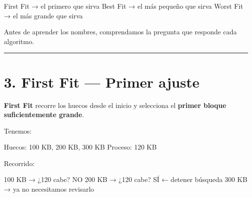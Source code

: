 \documentclass[
  spanish,
  letterpaper,
]{scrbook}
\newenvironment{Shaded}{\begin{snugshade}}{\end{snugshade}}
\newcommand{\NormalTok}[1]{\textcolor[rgb]{0.00,0.23,0.31}{#1}}
\begin{document}
\begin{Shaded}
\begin{Highlighting}[]
\NormalTok{First Fit  → el primero que sirva}
\NormalTok{Best Fit   → el más pequeño que sirva}
\NormalTok{Worst Fit  → el más grande que sirva}
\end{Highlighting}
\end{Shaded}

\begin{tcolorbox}[enhanced jigsaw, arc=.35mm, bottomrule=.15mm, bottomtitle=1mm, breakable, colback=white, colbacktitle=quarto-callout-important-color!10!white, colframe=quarto-callout-important-color-frame, coltitle=black, left=2mm, leftrule=.75mm, opacityback=0, opacitybacktitle=0.6, rightrule=.15mm, title=\textcolor{quarto-callout-important-color}{\faExclamation}\hspace{0.5em}{No memoricemos todavía}, titlerule=0mm, toprule=.15mm, toptitle=1mm]

Antes de aprender los nombres, comprendamos la pregunta que responde
cada algoritmo.

\end{tcolorbox}

\begin{center}\rule{0.5\linewidth}{0.5pt}\end{center}


\chapter{3. First Fit --- Primer
ajuste}\label{first-fit-primer-ajuste-1}

\textbf{First Fit} recorre los huecos desde el inicio y selecciona el
\textbf{primer bloque suficientemente grande}.

Tenemos:

\begin{Shaded}
\begin{Highlighting}[]
\NormalTok{Huecos: 100 KB, 200 KB, 300 KB}
\NormalTok{Proceso: 120 KB}
\end{Highlighting}
\end{Shaded}

Recorrido:

\begin{Shaded}
\begin{Highlighting}[]
\NormalTok{100 KB → ¿120 cabe? NO}
\NormalTok{200 KB → ¿120 cabe? SÍ  ← detener búsqueda}
\NormalTok{300 KB → ya no necesitamos revisarlo}
\end{Highlighting}
\end{Shaded}
\end{document}
